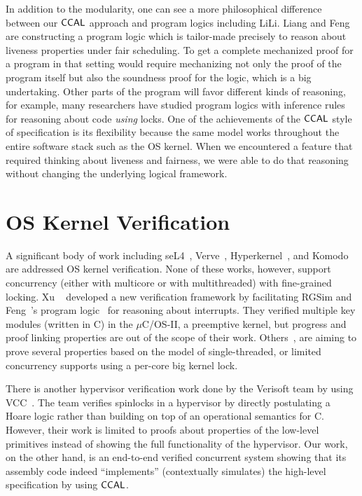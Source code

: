 In addition to the modularity, one can see a more philosophical difference
between our $\mathsf{CCAL}$ approach and program logics including LiLi.  
Liang and Feng are constructing a program logic which is tailor-made
precisely to reason about liveness properties under fair
scheduling. 
To get a complete mechanized proof for a program in that
setting would require mechanizing not only the proof of the program
itself but also the soundness proof for the logic, which is a big
undertaking. 
Other parts of the program will favor different kinds of
reasoning, for example, many researchers have studied program logics
with inference rules for reasoning about code \emph{using} locks. One
of the achievements of the $\mathsf{CCAL}$ style of specification is its flexibility because the same model works throughout the entire software stack such as the OS kernel. When
we encountered a feature that required thinking about liveness and
fairness, we were able to do that reasoning without changing the
underlying logical framework.


\section{OS Kernel Verification} 
\label{chatper:related:sec:os-kernel-verification}

A significant body
of  work including
seL4~\cite{klein2009sel4,klein14},
Verve~\cite{hawblitzel10}, Hyperkernel~\cite{hyperkernel}, and Komodo~\cite{komodo} are 
addressed OS kernel verification.
None of these works, however, support concurrency (either with multicore or with multithreaded)  with fine-grained locking.
Xu \etal~\cite{xu16} developed a new verification framework by facilitating RGSim
and Feng~\etal's program logic~\cite{feng08:aim} for reasoning
about interrupts.
They verified multiple  key modules (written in C) 
in the $\mu$C/OS-II, a preemptive kernel,
 but progress and proof linking properties are out of the scope of their work. 
Others~\cite{klein2009sel4,hawblitzel10, hyperkernel, komodo},
are aiming to prove several properties based on the model of single-threaded, or limited concurrency supports using a per-core big kernel lock.

There is another hypervisor verification work done by the Verisoft team by using VCC~\cite{leinenbach09}.
The team verifies spinlocks in a hypervisor by directly postulating a Hoare logic rather than building
on top of an operational semantics for C.
However, their work is limited to proofs about properties of the low-level primitives 
instead of showing the full functionality of
the hypervisor.
Our work, on the other hand, 
is an end-to-end verified concurrent system showing that its
assembly code indeed ``implements'' (contextually simulates) the
high-level specification by using $\mathsf{CCAL}$.

